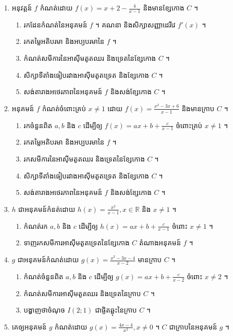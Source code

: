 \documentclass[12pt, a4paper]{article}
\begin{document}
\begin{enumerate}[m]
\begin{enumerate}[k,3]
		\end{enumerate}
	\item អនុវត្តន៍ $ f $ កំណត់ដោយ $f(x)=x+2-\frac{4}{x-1}$ និងមានខ្សែកោង $C$ ។
		\begin{enumerate}[k]
			\item រកដែនកំណត់នៃអនុគមន៍ $f$ ។ គណនា និងសិក្សាសញ្ញាដេរីវេ $f'(x)$ ។
			\item រកតម្លៃអតិបរមា និងអប្យបរមានៃ $f$ ។
			\item កំណត់សមីការនៃអាស៊ីមតូតឈរ និងទ្រេតនៃខ្សែកោង $C$ ។
			\item សិក្សាទីតាំងធៀបរវាងអាស៊ីមតូតទ្រេត និងខ្សែកោង $C$ ។
			\item សង់តារាងអថេរភាពនៃអនុគមន៍ $f$ និងសង់ខ្សែកោង $C$ ។
		\end{enumerate}
	\item អនុគមន៍ $f$ កំណត់ចំពោះគ្រប់ $x\neq 1$ ដោយ $f(x)=\frac{x^2-3x+6}{x-1}$ និងមានក្រាប $C$ ។
		\begin{enumerate}[k]
			\item រកចំនួនពិត $a, b$ និង $c$ ដើម្បីឲ្យ $f(x)=ax+b+\frac{c}{x-1}$ ចំពោះគ្រប់ $x\neq1$ ។
			\item រកតម្លៃអតិបរមា និងអប្បបរមានៃ $f$ ។
			\item រកសមីការនៃអាស៊ីមតូតឈរ និងទ្រេតនៃខ្សែកោង $C$ ។
			\item សិក្សាទីតាំងធៀបរវាងអាស៊ីមតូតទ្រេត និងខ្សែកោង $C$ ។
			\item សង់តារាងអថេរភាពនៃអនុគមន៍ $f$ និងសង់ខ្សែកោង $C$ ។
		\end{enumerate}
	\item $h$ ជាអនុគមន៍កំនត់ដោយ $h(x)=\frac{x^2}{x-1}, x\in\mathbb{R}$ និង $x\neq1$ ។
		\begin{enumerate}[k]
			\item កំណត់រក $a, b$ និង $c$ ដើម្បីឲ្យ $h(x)=ax+b+\frac{c}{x-1}$ ចំពោះ $x\neq1$ ។
			\item ទាញរកសមីការអាស៊ីមតូតទ្រេតនៃខ្សែកោង $C$ តំណាងអនុគមន៍ $f$ ។
		\end{enumerate}
	\item $g$ ជាអនុគមន៍កំណត់ដោយ $g(x)=\frac{x^2-3x-4}{x-2}$ មានក្រាប $C$ ។
		\begin{enumerate}[k]
			\item កំណត់ចំនួនពិត $a, b$ និង $c$ ដើម្បីឲ្យ $g(x)=ax+b+\frac{c}{x-2}$ ចំពោះ $x\neq2$ ។
			\item កំណត់សមីការអាស៊ីមតូតឈរ និងទ្រេតនៃក្រាប $C$ ។
			\item បង្ហាញថាចំណុច $I(2;1)$ ជាផ្ចិតឆ្លុះនៃក្រាប $C$ ។
		\end{enumerate}
	\item គេឲ្យអនុគមន៍ $g$ កំណត់ដោយ $g(x)=\frac{4x-4}{x^2}, x\neq0$ ។ $C$ ជាក្រាបនៃអនុគមន៍ $g$ ។

\end{enumerate}
\end{document}
